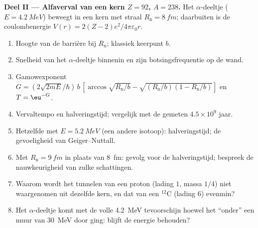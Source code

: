 \begin{problem}
\textbf{Deel II --- Alfaverval van een kern $Z = 92$, $A = 238$.}
Het $\alpha$-deeltje ($E = \qty{4.2}{MeV}$) beweegt in een kern met straal
$R_{\text{n}} = \qty{8}{fm}$; daarbuiten is de coulombenergie
$V(r) =
2(Z - 2)e^2/4\pi\varepsilon_0r$.
\begin{enumerate}[resume]
  \item Hoogte van de barrière bij $R_{\text{n}}$; klassiek keerpunt
        $b$.
  \item Snelheid van het $\alpha$-deeltje binnenin en zijn botsingsfrequentie op de
        wand.
  \item Gamowexponent
        $G = (2\sqrt{2mE}/\hbar)\,b\,[\arccos\sqrt{R_{\text{n}}/b}
        - \sqrt{(R_{\text{n}}/b)(1 - R_{\text{n}}/b)}]$
        en $T = \eu^{-G}$.
  \item Vervaltempo en halveringstijd; vergelijk met de gemeten
        $4.5 \times
        10^9$ jaar.
  \item Hetzelfde met $E = \qty{5.2}{MeV}$ (een andere isotoop): halveringstijd;
        de gevoeligheid van Geiger--Nuttall.
  \item Met $R_{\text{n}} = \qty{9}{fm}$ in plaats van \qty{8}{fm}: gevolg voor
        de halveringstijd; bespreek de nauwkeurigheid van zulke schattingen.
  \item Waarom wordt het tunnelen van een proton (lading $1$, massa $1/4$)
        niet waargenomen uit dezelfde kern, en dat van een $^{12}$C
        (lading $6$) evenmin?
  \item Het $\alpha$-deeltje komt met de volle \qty{4.2}{MeV} tevoorschijn
        hoewel het
        ``onder'' een muur van \qty{30}{MeV} door ging: blijft de energie behouden?
\end{enumerate}


\end{problem}
